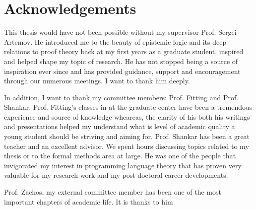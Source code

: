 \section*{Acknowledgements}
This thesis would have not been possible without my supervisor Prof. Sergei Artemov.
He introduced me to the beauty of epistemic logic and its deep relations to proof theory
back at my first years as a graduate student, inspired and helped shape my topic of research. 
He has not stopped being a source of inspiration ever
since and has provided guidance, support and encouragement through our numerous meetings. 
I want to thank him deeply.

In addition, I want to thank my committee members: Prof. Fitting and Prof. Shankar. Prof. Fitting's classes
in at the graduate center have been a tremendous experience and source of knowledge wheareas,
the clarity of his both his writings and presentations helped my understand what is 
level of academic quality a young student should be striving and aiming for. Prof. Shankar has
been a great teacher and an excellent advisor. We spent hours 
discussing topics related to my thesis or to the formal methods area at large. He was one
of the people that invigorated my interest in programming language theory that has
proven very valuable for my research work and my post-doctoral career developments.

Prof. Zachos, my external committee member has been one of the most important
chapters of academic life. It is thanks to him 